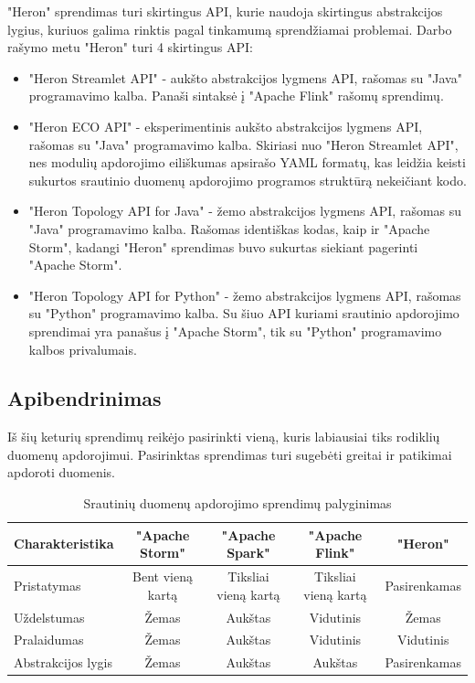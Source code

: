 \documentclass{VUMIFPSbakalaurinis}
\begin{document}
"Heron" sprendimas turi skirtingus API, kurie naudoja skirtingus abstrakcijos lygius, kuriuos galima rinktis pagal tinkamumą sprendžiamai problemai. Darbo rašymo metu "Heron" turi 4 skirtingus API:
\begin{itemize}
    \item "Heron Streamlet API" - aukšto abstrakcijos lygmens API, rašomas su "Java" programavimo kalba. Panaši sintaksė į "Apache Flink" rašomų sprendimų.
    \item "Heron ECO API" - eksperimentinis aukšto abstrakcijos lygmens API, rašomas su "Java" programavimo kalba. Skiriasi nuo "Heron Streamlet API", nes modulių apdorojimo eiliškumas apsirašo YAML formatų, kas leidžia keisti sukurtos srautinio duomenų apdorojimo programos struktūrą nekeičiant kodo.
    \item "Heron Topology API for Java" - žemo abstrakcijos lygmens API, rašomas su "Java" programavimo kalba. Rašomas identiškas kodas, kaip ir "Apache Storm", kadangi "Heron" sprendimas buvo sukurtas siekiant pagerinti "Apache Storm".
    \item "Heron Topology API for Python" - žemo abstrakcijos lygmens API, rašomas su "Python" programavimo kalba. Su šiuo API kuriami srautinio apdorojimo sprendimai yra panašus į "Apache Storm", tik su "Python" programavimo kalbos privalumais.
\end{itemize}  


\subsection{Apibendrinimas}
Iš šių keturių sprendimų reikėjo pasirinkti vieną, kuris labiausiai tiks rodiklių duomenų apdorojimui. Pasirinktas sprendimas turi sugebėti greitai ir patikimai apdoroti duomenis.\par

\begin{table}[!htbp]
    \begin{center}
        \caption{Srautinių duomenų apdorojimo sprendimų palyginimas}
        \label{table:comparer}
        \begin{tabular}{ | l | c | c | c | c | } 
            \hline
            \cellcolor[gray]{0.8} Charakteristika & \cellcolor[gray]{0.9} "Apache Storm" & \cellcolor[gray]{0.9} "Apache Spark" & \cellcolor[gray]{0.9} "Apache Flink" & \cellcolor[gray]{0.9} "Heron" \\* \hline
            \cellcolor[gray]{0.9} Pristatymas & Bent vieną kartą & Tiksliai vieną kartą & Tiksliai vieną kartą & Pasirenkamas \\* \hline
            \cellcolor[gray]{0.9} Uždelstumas & Žemas & Aukštas & Vidutinis & Žemas \\* \hline
            \cellcolor[gray]{0.9} Pralaidumas & Žemas & Aukštas & Vidutinis & Vidutinis \\* \hline
            \cellcolor[gray]{0.9} Abstrakcijos lygis & Žemas & Aukštas & Aukštas & Pasirenkamas \\* \hline
        \end{tabular}
    \end{center}
\end{table}\par
\end{document}
